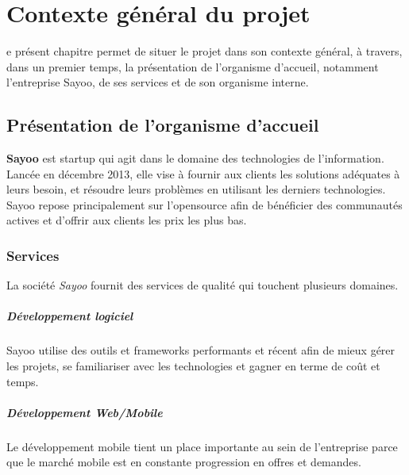 \chapter{Contexte général du projet}
\begin{onehalfspace}

e présent chapitre permet de situer le projet dans son contexte général, à travers, dans un premier temps, la présentation de l'organisme d'accueil, notamment l'entreprise Sayoo, de ses services et de son organisme interne.

\newpage


\section{Présentation de l'organisme d'accueil}

\textbf{Sayoo} est startup qui agit dans le domaine des technologies de l'information. Lancée en décembre 2013, elle vise à fournir aux clients les solutions adéquates à leurs besoin, et résoudre leurs problèmes en utilisant les derniers technologies. Sayoo repose principalement sur l'opensource afin de bénéficier des communautés actives et d'offrir aux clients les prix les plus bas.



\subsection{Services}
La société \emph{Sayoo} fournit des services de qualité qui touchent plusieurs domaines.
\paragraph*{Développement logiciel}
Sayoo utilise des outils et frameworks performants et récent afin de mieux gérer les projets, se familiariser avec les technologies et gagner en terme de coût et temps.

\paragraph*{Développement Web/Mobile}
Le développement mobile tient un place importante au sein de l'entreprise parce que le marché mobile est en constante progression en offres et demandes. 


\end{onehalfspace}
